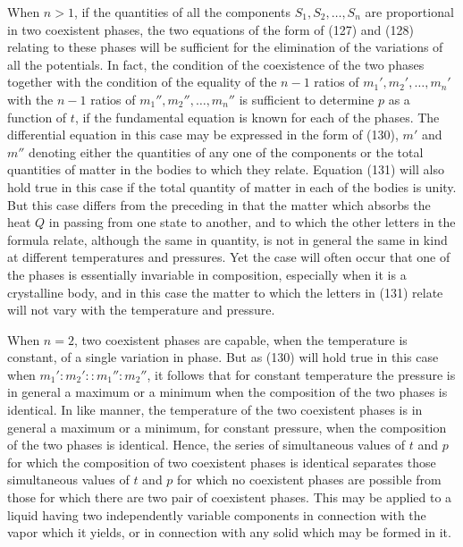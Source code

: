 \documentclass[11pt]{article}
\begin{document}
When \(n>1\), if the quantities of all the components \(S_1,S_2,\ldots,S_n\) are proportional in two coexistent phases, the two equations of the form of (127) and (128) relating to these phases will be sufficient for the elimination of the variations of all the potentials. In fact, the condition of the coexistence of the two phases together with the condition of the equality of the \(n-1\) ratios of \(m_1',m_2',\ldots,m_n'\) with the \(n-1\) ratios of \(m_1'',m_2'',\ldots,m_n''\) is sufficient to determine \(p\) as a function of \(t\), if the fundamental equation is known for each of the phases. The differential equation in this case may be expressed in the form of (130), \(m'\) and \(m''\) denoting either the quantities of any one of the components or the total quantities of matter in the bodies to which they relate. Equation (131) will also hold true in this case if the total quantity of matter in each of the bodies is unity. But this case differs from the preceding in that the matter which absorbs the heat \(Q\) in passing from one state to another, and to which the other letters in the formula relate, although the same in quantity, is not in general the same in kind at different temperatures and pressures. Yet the case will often occur that one of the phases is essentially invariable in composition, especially when it is a crystalline body, and in this case the matter to which the letters in (131) relate will not vary with the temperature and pressure.

When \(n=2\), two coexistent phases are capable, when the temperature is constant, of a single variation in phase. But as (130) will hold true in this case when \(m_1':m_2'::m_1'':m_2''\), it follows that for constant temperature the pressure is in general a maximum or a minimum when the composition of the two phases is identical. In like manner, the temperature of the two coexistent phases is in general a maximum or a minimum, for constant pressure, when the composition of the two phases is identical. Hence, the series of simultaneous values of \(t\) and \(p\) for which the composition of two coexistent phases is identical separates those simultaneous values of \(t\) and \(p\) for which no coexistent phases are possible from those for which there are two pair of coexistent phases. This may be applied to a liquid having two independently variable components in connection with the vapor which it yields, or in connection with any solid which may be formed in it.
\end{document}
